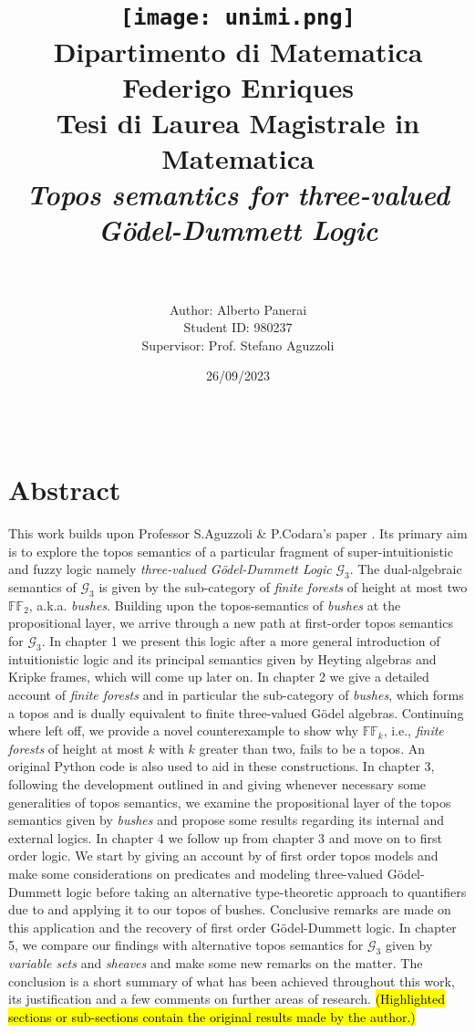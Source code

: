 \documentclass[12pt]{report}
\title{
	{\texttt{[image: unimi.png]}} \\
	\vspace{0.3cm}
	{\large Dipartimento di Matematica Federigo Enriques}\\
	\vspace{1cm}
	{\large \textbf{Tesi di Laurea Magistrale in Matematica }}\\
	\vspace{1cm}
		{\emph{Topos semantics for three-valued Gödel-Dummett Logic}}\\
}
\author{\\ \\ Author: Alberto Panerai \\ 
	Student ID: 980237 \\ Supervisor: Prof. Stefano Aguzzoli}
\date{26/09/2023}
\theoremstyle{plain}
\theoremstyle{definition}
\theoremstyle{remark}
\begin{document}
 	\maketitle
 	
 	${}$ \newpage
 	\chapter*{Abstract}
 	This work builds upon Professor S.Aguzzoli \& P.Codara's paper \cite{towards}. \newline
 	Its primary aim is to explore the topos semantics of a particular fragment of super-intuitionistic and fuzzy logic namely \emph{three-valued Gödel-Dummett Logic} $\mathcal{G}_3$. 
 	The dual-algebraic semantics of $\mathcal{G}_3$ is given by the sub-category of \emph{finite forests} of height at most two $\mathbb{FF}_2$, a.k.a. \emph{bushes}. Building upon the topos-semantics of \emph{bushes} at the propositional layer, we arrive through a new path at first-order topos semantics for $\mathcal{G}_3$.\newline
 In chapter 1 we present this logic after a more general introduction of intuitionistic logic and its principal semantics given by Heyting algebras and Kripke frames, which will come up later on. \newline
 In chapter 2 we give a detailed account of \emph{finite forests} and in particular the sub-category of \emph{bushes}, which forms a topos and is dually equivalent to finite three-valued Gödel algebras.
Continuing where \cite{towards} left off, we provide a novel counterexample to show why $\mathbb{FF}_k$, i.e., \emph{finite forests} of height at most $k$ with $k$ greater than two, fails to be a topos. An original Python code is also used to aid in these constructions. \newline
 In chapter 3, following the development outlined in \cite{goldblatt} and giving whenever necessary some generalities of topos semantics, we examine the propositional layer of the topos semantics given by \emph{bushes} and propose some results regarding its internal and external logics. \newline
 In chapter 4 we follow up from chapter 3 and move on to first order logic. We start by giving an account by \cite{goldblatt} of first order topos models and make some considerations on predicates and modeling three-valued Gödel-Dummett logic before taking an alternative type-theoretic approach to quantifiers due to \cite{lambekscott} and applying it to our topos of bushes. Conclusive remarks are made on this application and the recovery of first order Gödel-Dummett logic. \newline   
 In chapter 5,  we compare our findings with alternative topos semantics for $\mathcal{G}_3$ given by \emph{variable sets} and \emph{sheaves} and make some new remarks on the matter. \newline
 The conclusion is a short summary of what has been achieved throughout this work, its justification and a few comments on further areas of research. \newline\newline
 \hl{(Highlighted sections or sub-sections contain the original results made by the author.)
}
\end{document}
